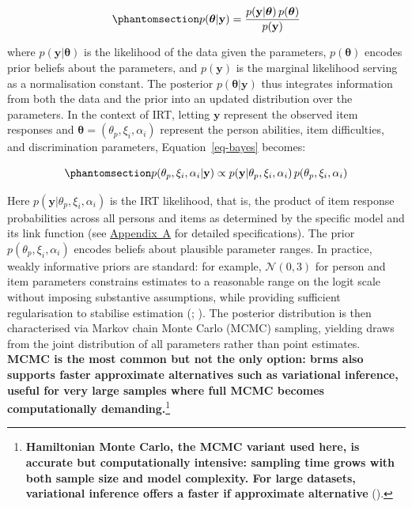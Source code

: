 \documentclass[
  man,
  floatsintext,
  longtable,
  nolmodern,
  notxfonts,
  notimes,
  colorlinks=true,linkcolor=blue,citecolor=blue,urlcolor=blue]{apa7}
\newcommand{\rev}[1]{\textbf{\textcolor{revcol}{#1}}}  %
\begin{document}
\begin{equation}\phantomsection\label{eq-bayes}{
p(\boldsymbol{\theta} | \mathbf{y}) = \frac{p(\mathbf{y} | \boldsymbol{\theta}) \, p(\boldsymbol{\theta})}{p(\mathbf{y})}
}\end{equation}

where \(p(\mathbf{y} | \boldsymbol{\theta})\) is the likelihood of the
data given the parameters, \(p(\boldsymbol{\theta})\) encodes prior
beliefs about the parameters, and \(p(\mathbf{y})\) is the marginal
likelihood serving as a normalisation constant. The posterior
\(p(\boldsymbol{\theta} | \mathbf{y})\) thus integrates information from
both the data and the prior into an updated distribution over the
parameters. In the context of IRT, letting \(\mathbf{y}\) represent the
observed item responses and
\(\boldsymbol{\theta} = (\theta_p, \xi_i, \alpha_i)\) represent the
person abilities, item difficulties, and discrimination parameters,
Equation~\ref{eq-bayes} becomes:

\begin{equation}\phantomsection\label{eq-bayes-irt}{
p(\theta_p, \xi_i, \alpha_i | \mathbf{y}) \propto p(\mathbf{y} | \theta_p, \xi_i, \alpha_i) \, p(\theta_p, \xi_i, \alpha_i)
}\end{equation}

Here \(p(\mathbf{y} | \theta_p, \xi_i, \alpha_i)\) is the IRT
likelihood, that is, the product of item response probabilities across
all persons and items as determined by the specific model and its link
function (see \hyperref[apx-models]{Appendix~A} for detailed
specifications). The prior \(p(\theta_p, \xi_i, \alpha_i)\) encodes
beliefs about plausible parameter ranges. In practice, weakly
informative priors are standard: for example, \(\mathcal{N}(0, 3)\) for
person and item parameters constrains estimates to a reasonable range on
the logit scale without imposing substantive assumptions, while
providing sufficient regularisation to stabilise estimation
(;
). The posterior
distribution is then characterised via Markov chain Monte Carlo (MCMC)
sampling, yielding draws from the joint distribution of all parameters
rather than point estimates.
\rev{MCMC is the most common but not the only option: brms also supports faster approximate alternatives such as variational inference, useful for very large samples where full MCMC becomes computationally demanding.}\footnote{\rev{Hamiltonian Monte Carlo, the MCMC variant used here, is accurate but computationally intensive: sampling time grows with both sample size and model complexity. For large datasets, variational inference offers a faster if approximate alternative}
  ().}
\end{document}
